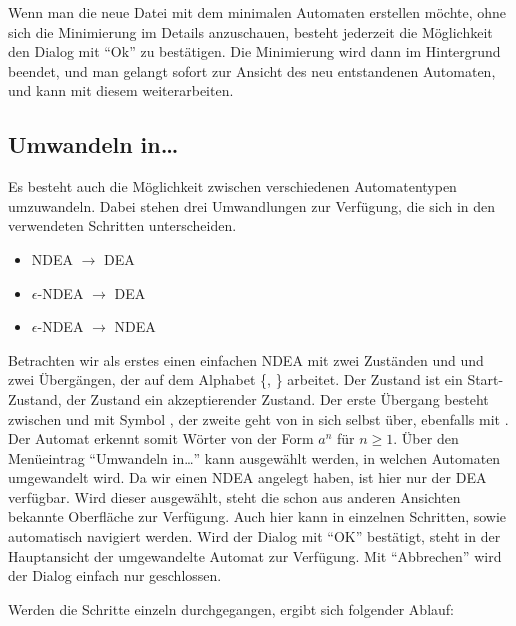   Wenn man die neue Datei mit dem minimalen Automaten erstellen möchte, ohne sich
  die Minimierung im Details anzuschauen, besteht jederzeit die Möglich\-keit den
  Dialog mit "`Ok"' zu bestätigen. Die Minimierung wird dann im Hintergrund
  beendet, und man gelangt sofort zur Ansicht des neu entstandenen Automaten, und
  kann mit diesem weiterarbeiten.
  
  
\subsection{Umwandeln in\ldots}\label{ConvertTo}
  
Es besteht auch die Möglichkeit zwischen verschiedenen Automatentypen
umzuwandeln. Dabei stehen drei Umwandlungen zur Verfügung, die sich in den
verwendeten Schritten unterscheiden.

\begin{itemize}
  \item NDEA $\to$ DEA
  \item $\epsilon$-NDEA $\to$ DEA
  \item $\epsilon$-NDEA $\to$ NDEA
\end{itemize}

Betrachten wir als erstes einen einfachen NDEA mit zwei Zuständen  und
 und zwei Übergängen, der auf dem Alphabet \{, \}
arbeitet. Der Zustand  ist ein Start-Zustand, der Zustand 
ein akzeptierender Zustand. Der erste Übergang besteht zwischen  und
 mit Symbol , der zweite geht von  in sich selbst
über, ebenfalls mit . Der Automat erkennt somit Wörter von der Form
$a^n$ für $n \geq 1$. Über den Menüeintrag "`Umwandeln in\ldots"' kann ausgewählt
werden, in welchen Automaten umgewandelt wird. Da wir einen NDEA angelegt haben,
ist hier nur der DEA verfügbar. Wird dieser ausgewählt, steht die schon aus
anderen Ansichten bekannte Oberfläche zur Verfügung. Auch hier kann in einzelnen
Schritten, sowie automatisch navigiert werden. Wird der Dialog mit "`OK"'
bestätigt, steht in der Hauptansicht der umgewandelte Automat zur Verfügung. Mit
"`Abbrechen"' wird der Dialog einfach nur geschlossen.\vspace{10pt}

Werden die Schritte einzeln durchgegangen, ergibt sich folgender Ablauf:

